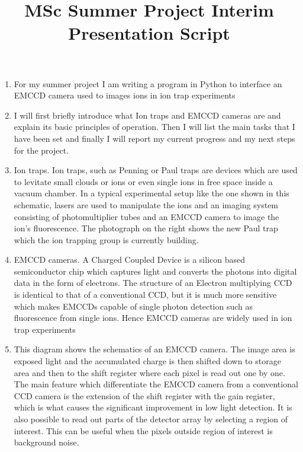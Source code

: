 \documentclass[12pt]{article}
\title{MSc Summer Project Interim Presentation Script}
\begin{document}
\maketitle


\begin{enumerate}
\item For my summer project I am writing a program in Python to interface an EMCCD camera used to images ions in ion trap experiments

\item I will first briefly introduce what Ion traps and EMCCD cameras are and explain its basic principles of operation. Then I will list the main tasks that I have been set and finally I will report my current progress and my next steps for the project.

\item Ion traps. Ion traps, such as Penning or Paul traps are devices which  are used to levitate small clouds or ions or even single ions in free space inside a vacuum chamber. In a typical experimental setup like the one shown in this schematic, lasers are used to manipulate the ions and an imaging system consisting of photomultiplier tubes and an EMCCD camera to image the ion's fluorescence. The photograph on the right shows the new Paul trap which the ion trapping group is currently building.

\item EMCCD cameras. A Charged Coupled Device is a silicon based semiconductor chip which captures light and converts the photons into digital data in the form of electrons. The structure of an Electron multiplying CCD is identical to that of a conventional CCD, but it is much more sensitive which makes EMCCDs capable of single photon detection such as fluorescence from single ions. Hence EMCCD cameras are widely used in ion trap experiments

\item This diagram shows the schematics of an EMCCD camera. The image area is exposed light and the accumulated charge is then shifted down to storage area and then to the shift register where each pixel is read out one by one. The main feature which differentiate the EMCCD camera from a conventional CCD camera is the extension of the shift register with the gain register, which is what causes the significant improvement in low light detection. It is also possible to read out parts of the detector array by selecting a region of interest. This can be useful when the pixels outside region of interest is background noise.


\end{enumerate}
\end{document}
